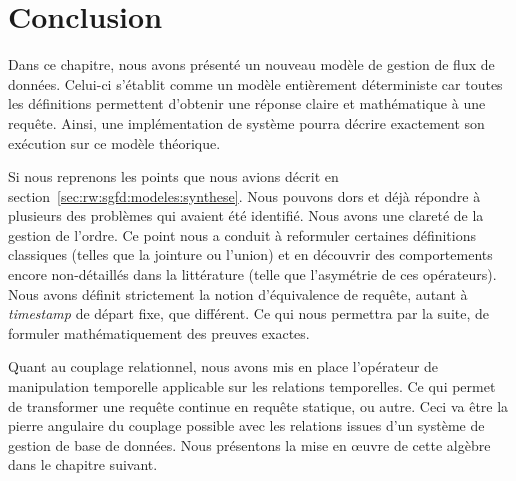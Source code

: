 \section{Conclusion}\label{sec:contrib:astral:conclusion}
Dans ce chapitre, nous avons présenté un nouveau modèle de gestion de flux de données. Celui-ci s'établit comme un modèle entièrement déterministe car toutes les définitions permettent d'obtenir une réponse claire et mathématique à une requête. Ainsi, une implémentation de système pourra décrire exactement son exécution sur ce modèle théorique.

Si nous reprenons les points que nous avions décrit en section~\ref{sec:rw:sgfd:modeles:synthese}. Nous pouvons dors et déjà répondre à plusieurs des problèmes qui avaient été identifié. Nous avons une clareté de la gestion de l'ordre. Ce point nous a conduit à reformuler certaines définitions classiques (telles que la jointure ou l'union) et en découvrir des comportements encore non-détaillés dans la littérature (telle que l'asymétrie de ces opérateurs). Nous avons définit strictement la notion d'équivalence de requête, autant à \textit{timestamp} de départ fixe, que différent. Ce qui nous permettra par la suite, de formuler mathématiquement des preuves exactes.

Quant au couplage relationnel, nous avons mis en place l'opérateur de manipulation temporelle applicable sur les relations temporelles. Ce qui permet de transformer une requête continue en requête statique, ou autre. Ceci va être la pierre angulaire du couplage possible avec les relations issues d'un système de gestion de base de données. Nous présentons la mise en œuvre de cette algèbre dans le chapitre suivant.
